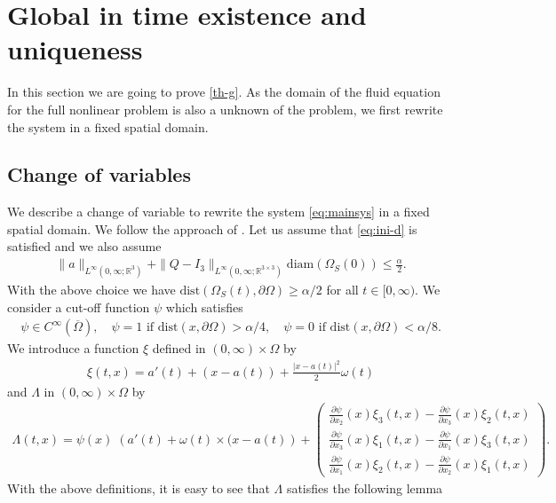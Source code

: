 \documentclass[12pt,a4paper,reqno]{amsart}
\theoremstyle{definition}
\theoremstyle{remark}
\numberwithin{equation}{section}
\newcommand{\ost}{\Omega_{S}(t)}
\newcommand{\oso}{\Omega_{S}(0)}
\newcommand{\rt}{\mathbb{R}^{3}}
\newcommand{\ds}{\displaystyle}
\begin{document}
\section{Global in time existence and uniqueness} \label{sec:gr}
In this section we are going to prove \cref{th-g}. As the domain of the fluid equation for the full nonlinear problem is also a unknown of the problem, we first rewrite the system in a fixed spatial domain.
\subsection{Change of variables}
We describe a change of variable to rewrite the system \eqref{eq:mainsys} in a fixed spatial domain. We follow the approach of \cite{Cum08}. Let us assume that \eqref{eq:ini-d} is satisfied and we also assume
\begin{align} \label{eq:c1}
 \|a\|_{L^{\infty}(0,\infty;\rt)} + \|Q - I_{3}\|_{L^{\infty}(0,\infty;\mathbb{R}^{3 \times 3})}  \mathrm{diam} (\oso) \leqslant \frac{\alpha}{2}.
\end{align}
With the above choice  we have $\mathrm{dist} \left(\ost,\partial\Omega\right) \geqslant \alpha/2  $ for all $t \in [0,\infty).$ We consider a cut-off function $\psi$ which satisfies
\begin{align}
\psi \in C^{\infty}(\overline \Omega), \quad \psi = 1 \mbox{ if } \mathrm{dist}(x,\partial \Omega) > \alpha/4, \quad \psi = 0 \mbox{ if } \mathrm{dist}(x,\partial \Omega) < \alpha/8.
\end{align}
We introduce a function $\xi$ defined in $(0,\infty) \times \Omega$ by
\begin{align*}
\xi(t,x) = a'(t) + (x - a(t)) + \frac{|x-a(t)|^{2}}{2} \omega(t)
\end{align*}
and $\Lambda$  in $(0,\infty) \times \Omega$ by
\begin{align*}
\Lambda(t,x) =
\psi(x) \; \left(a'(t) + \omega(t) \times (x -a(t)\right) +
\begin{pmatrix}
\ds \frac{\partial \psi}{\partial x_{2}}(x) \xi_{3}(t,x) - \frac{\partial \psi}{\partial x_{3}}(x) \xi_{2}(t,x) \\
\ds \frac{\partial \psi}{\partial x_{3}}(x) \xi_{1} (t,x)- \frac{\partial \psi}{\partial x_{1}}(x) \xi_{3} (t,x)\\
\ds \frac{\partial \psi}{\partial x_{1}}(x) \xi_{2}(t,x) - \frac{\partial \psi}{\partial x_{2}}(x) \xi_{1}(t,x)
\end{pmatrix}.
\end{align*}
With the above definitions, it is easy to see that $\Lambda$ satisfies the following lemma
\end{document}
